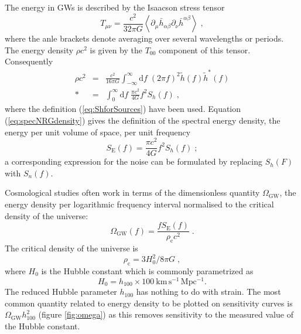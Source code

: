 The energy in GWs is described by the Isaacson stress tensor \citep[section 35.15]{MTW}
\begin{equation}
T_{\mu\nu}=\frac{c^{2}}{32\pi G}\left<\partial_{\mu}\bar{h}_{\alpha\beta}\partial_{\nu}\bar{h}^{\alpha\beta}\right> \;,
\end{equation}
where the anle brackets denote averaging over several wavelengths or periods. The energy density $\rho c^{2}$ is given by the $T_{00}$ component of this tensor. Consequently
\begin{eqnarray}
\label{eq:specNRGdensity}
\rho c^{2} &=& \frac{c^{2}}{16\pi G}\int_{-\infty}^{\infty}\mathrm{d}f\;\left(2\pi f\right)^{2}\tilde{h}(f)\tilde{h}^{*}(f) \\*
 &=& \int_{0}^{\infty}\mathrm{d}f\;\frac{\pi c^{2}}{4G}f^{2}S_{h}(f)\; ,
\end{eqnarray} 
where the definition (\ref{eq:ShforSources}) have been used. Equation (\ref{eq:specNRGdensity}) gives the definition of the spectral energy density, the energy per unit volume of space, per unit frequency \citep{HellingsDowns}
\begin{equation}\label{eq:spectralenergydensity}
S_{\mathrm{E}}(f)=\frac{\pi c^{2}}{4G} f^{2}S_{h}(f) \; ;
\end{equation}
a corresponding expression for the noise can be formulated by replacing $S_h(F)$ with $S_{n}(f)$.

Cosmological studies often work in terms of the dimensionless quantity $\Omega_{\mathrm{GW}}$, the energy density per logarithmic frequency interval normalised to the critical density of the universe:
\begin{equation}
\label{eq:omega}
\Omega_{\mathrm{GW}}(f) = \frac{fS_{\mathrm{E}}(f)}{\rho_{\mathrm{c}}c^{2}} \; .
\end{equation}
The critical density of the universe is
\begin{equation}\label{eq:crit-density}
\rho_{\mathrm{c}}=3H_{0}^{2}/8\pi G \;,
\end{equation}
 where $H_{0}$ is the Hubble constant which is commonly parametrized as
\begin{equation}
H_0 =h_{100}\times 100~\mathrm{km\,s^{-1}\,Mpc^{-1}}.
\end{equation}
The reduced Hubble parameter $h_{100}$ has nothing to do with strain. The most common quantity related to energy density to be plotted on sensitivity curves is $\Omega_{\mathrm{GW}}h_{100}^{2}$ (figure \ref{fig:omega}) as this removes sensitivity to the measured value of the Hubble constant.

